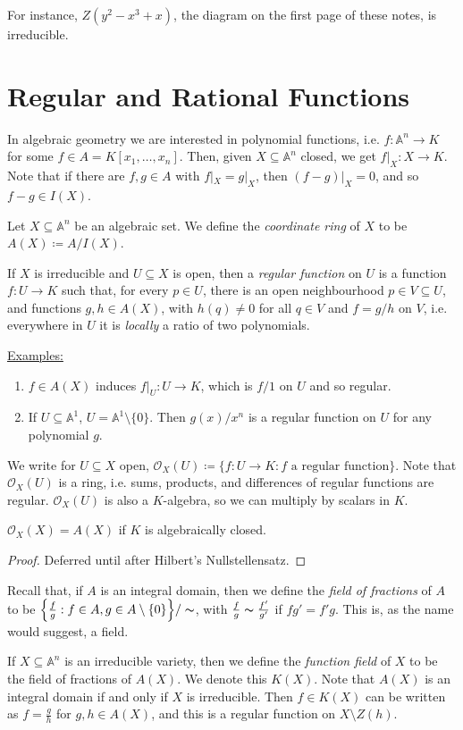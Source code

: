 \documentclass[10pt,a4paper]{article}
\begin{document}
For instance, $Z(y^2-x^3+x)$, the diagram on the first page of these notes, is irreducible.

\section{Regular and Rational Functions}
In algebraic geometry we are interested in polynomial functions, i.e. $f: \mathbb{A}^n \to K$ for some $f \in A = K[x_1, \ldots, x_n]$. Then, given $X \subseteq \mathbb{A}^n$ closed, we get $f|_X : X \to K$. Note that if there are $f,g \in A$ with $f|_X = g|_X$, then $(f-g)|_X = 0$, and so $f-g \in I(X)$.

Let $X \subseteq \mathbb{A}^n$ be an algebraic set. We define the \emph{coordinate ring} of $X$ to be $A(X) \coloneqq A/I(X)$.

If $X$ is irreducible and $U \subseteq X$ is open, then a \emph{regular function} on $U$ is a function $f:U \to K$ such that, for every $p \in U$, there is an open neighbourhood $p \in V \subseteq U$, and functions $g, h \in A(X)$, with $h(q) \neq 0$ for all $q \in V$ and $f = g/h$ on $V$, i.e. everywhere in $U$ it is \textit{locally} a ratio of two polynomials.

\hspace*{-1em}\underline{Examples:}
\begin{enumerate}
\item $f \in A(X)$ induces $f|_U: U \to K$, which is $f/1$ on $U$ and so regular.
\item If $U \subseteq \mathbb{A}^1$, $U = \mathbb{A}^1 \setminus\{0\}$. Then $g(x)/x^n$ is a regular function on $U$ for any polynomial $g$.
\end{enumerate}

We write for $U \subseteq X$ open, $\mathcal{O}_X(U) \coloneqq \{f:U \to K: f\text{ a regular function}\}$. Note that $\mathcal{O}_X(U)$ is a ring, i.e. sums, products, and differences of regular functions are regular. $\mathcal{O}_X(U)$ is also a $K$-algebra, so we can multiply by scalars in $K$.

\begin{lemma}
$\mathcal{O}_X(X) = A(X)$ if $K$ is algebraically closed.
\end{lemma}
\begin{proof}
Deferred until after Hilbert's Nullstellensatz.
\end{proof}

Recall that, if $A$ is an integral domain, then we define the \emph{field of fractions} of $A$ to be $\Big\{\frac{f}{g} : f \in A, g \in A \setminus\{0\}\Big\}/\thicksim$, with $\frac{f}{g} \thicksim \frac{f'}{g'}$ if $fg' = f'g$. This is, as the name would suggest, a field.

If $X \subseteq \mathbb{A}^n$ is an irreducible variety, then we define the \emph{function field} of $X$ to be the field of fractions of $A(X)$. We denote this $K(X)$. Note that $A(X)$ is an integral domain if and only if $X$ is irreducible. Then $f \in K(X)$ can be written as $f=\frac{g}{h}$ for $g,h \in A(X)$, and this is a regular function on $X \setminus Z(h)$.
\end{document}
